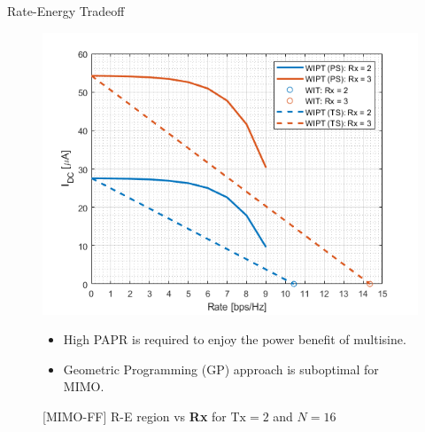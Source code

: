 \documentclass[xcolor={table}]{beamer}
\begin{document}
\begin{frame}[fragile=singleslide,t]
\begin{columns}[onlytextwidth,T]
\begin{column}{.47\textwidth}
\begin{block}{Rate-Energy Tradeoff}
\begin{figure}
\begin{minipage}[t]{0.48\textwidth}
\includegraphics[width=\textwidth]{re_ff_mimo_subband_2}
\caption{[MIMO-FF] R-E region vs \textbf{Rx} for ${\text{Tx}} = 2$ and $N = 16$}\label{fig:mimo}
\end{minipage}
\begin{itemize}
  \item High PAPR is required to enjoy the power benefit of multisine.
  \item Geometric Programming (GP) approach is suboptimal for MIMO.
\end{itemize}
\end{figure}
\end{block}

\printbibliography

\end{column}
\end{columns}

\end{frame}
\end{document}
